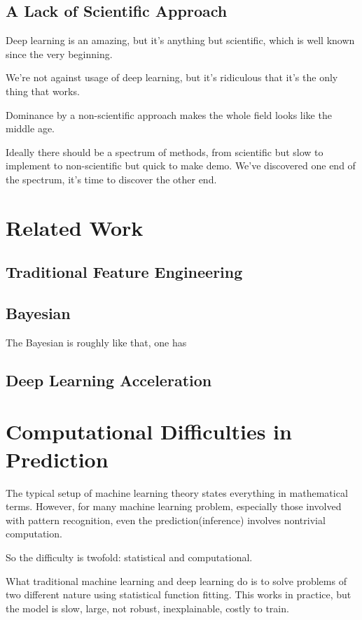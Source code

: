 \documentclass[11pt]{article} 	%
\theoremstyle{definition}
\begin{document}
\subsection{A Lack of Scientific Approach}

Deep learning is an amazing, but it's anything but scientific, which is well known since the very beginning.

We're not against usage of deep learning, but it's ridiculous that it's the only thing that works.

Dominance by a non-scientific approach makes the whole field looks like the middle age.

Ideally there should be a spectrum of methods, from scientific but slow to implement to non-scientific but quick to make demo. We've discovered one end of the spectrum, it's time to discover the other end.

\section{Related Work}

\subsection{Traditional Feature Engineering}

\subsection{Bayesian}

The Bayesian is roughly like that, one has 

\subsection{Deep Learning Acceleration}


\section{Computational Difficulties in Prediction}

The typical setup of machine learning theory states everything in mathematical terms.
However, for many machine learning problem, especially those involved with pattern recognition, even the prediction(inference) involves nontrivial computation.

So the difficulty is twofold: statistical and computational.

What traditional machine learning and deep learning do is to solve problems of two different nature using statistical function fitting.
This works in practice, but the model is slow, large, not robust, inexplainable, costly to train.
\end{document}
